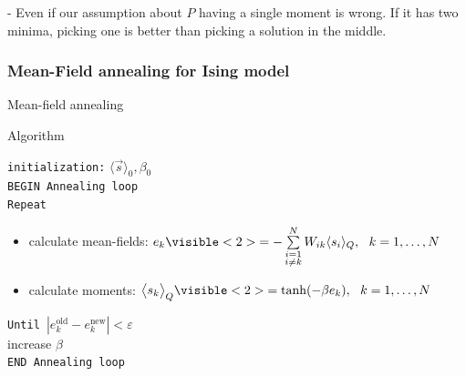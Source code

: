 \begin{frame}



- Even if our assumption about $P$ having a single moment is wrong. If it has two minima, picking one is better than picking a solution in the middle.

\end{frame}

\subsubsection{Mean-Field annealing for Ising model}

\begin{frame}{Mean-field annealing}
\begin{block}{Algorithm}
% 

\texttt{initialization:} $\langle \vec{s} \rangle_0, \beta_0$ \; \\
\texttt{BEGIN Annealing loop}\\
\oident \texttt{Repeat} \\
\begin{itemize}
  \item calculate mean-fields: $e_k\visible<2>{= - \sum\limits_{\substack{i=1 \\ i\ne k}}^N W_{ik} \langle s_i \rangle_Q}, \ \ k = 1, \ldots, N$ \;
  \item calculate moments: $\big<s_k\big>_Q\visible<2>{= \tanh(-\beta e_k)},\ \ k = 1, \ldots, N$ \;
\end{itemize}
\oident\texttt{Until $|e_k^\mathrm{old}-e_k^\mathrm{new}| < \varepsilon$} \\
\oident increase $\beta$ \; \\
\texttt{END Annealing loop}
\end{block}
\end{frame}

\begin{frame}
\end{frame}
